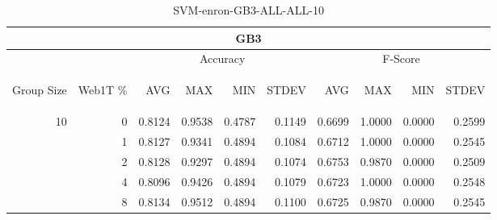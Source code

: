 \begin{center}
\begin{table}[htbp] 
 \begin{center}
\begin{tabular}{ | r | r | r | r | r | r | r | r | r | r |}
\hline
\multicolumn{10}{|c|}{GB3}\\
\hline
 & & \multicolumn{4}{|c|}{Accuracy} & \multicolumn{4}{|c|}{F-Score}\\ \cline{3-10}
\begin{sideways}Group Size\end{sideways} & \begin{sideways}Web1T \%\end{sideways} & \begin{sideways}AVG\end{sideways} & \begin{sideways}MAX\end{sideways} & \begin{sideways}MIN\end{sideways} & \begin{sideways}STDEV\end{sideways} & \begin{sideways}AVG\end{sideways} & \begin{sideways}MAX\end{sideways} & \begin{sideways}MIN\end{sideways} & \begin{sideways}STDEV\end{sideways}\\
\hline
\multirow{4}{*}{10}
 & 0 & 0.8124 & 0.9538 & 0.4787 & 0.1149 & 0.6699 & 1.0000 & 0.0000 & 0.2599\\ \cline{2-10}
 & 1 & 0.8127 & 0.9341 & 0.4894 & 0.1084 & 0.6712 & 1.0000 & 0.0000 & 0.2545\\ \cline{2-10}
 & 2 & 0.8128 & 0.9297 & 0.4894 & 0.1074 & 0.6753 & 0.9870 & 0.0000 & 0.2509\\ \cline{2-10}
 & 4 & 0.8096 & 0.9426 & 0.4894 & 0.1079 & 0.6723 & 1.0000 & 0.0000 & 0.2548\\ \cline{2-10}
 & 8 & 0.8134 & 0.9512 & 0.4894 & 0.1100 & 0.6725 & 0.9870 & 0.0000 & 0.2545\\ \cline{2-10}
\hline
\end{tabular}
\caption{SVM-enron-GB3-ALL-ALL-10}
\label{table:SVM-enron-GB3-ALL-ALL-10}
\end{center}
 \end{table}
\end{center}

